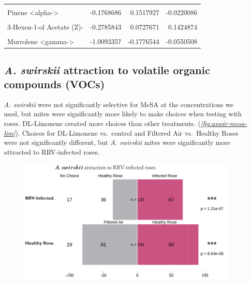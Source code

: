 \documentclass[12pt,final,CPage]{ufthesis}
\begin{document}
{\begin{longtable}[t]{lrrr}
  \cellcolor{gray!6}{Farnesene <(E,E)-, alpha->} & \cellcolor{gray!6}{-0.1703874} & \cellcolor{gray!6}{0.0430163} & \cellcolor{gray!6}{0.0170290}\\
  Pinene <alpha-> & -0.1768686 & 0.1517927 & -0.0220086\\
  \cellcolor{gray!6}{Ocimene, <beta->} & \cellcolor{gray!6}{-0.2027449} & \cellcolor{gray!6}{0.1639320} & \cellcolor{gray!6}{-0.0248480}\\
  3-Hexen-1-ol Acetate (Z)- & -0.2785843 & 0.0727671 & 0.1424874\\
  \addlinespace
  \cellcolor{gray!6}{Caryophyllene <beta->} & \cellcolor{gray!6}{-0.3896566} & \cellcolor{gray!6}{0.1118965} & \cellcolor{gray!6}{-0.0339373}\\
  Murrolene <gamma-> & -1.0093357 & -0.1776544 & -0.0550508\\*
  \end{longtable}
  \hypertarget{results-olfact}{%
  \subsection{\texorpdfstring{\emph{A. swirskii} attraction to volatile organic compounds (VOCs)}{A. swirskii attraction to volatile organic compounds (VOCs)}}\label{results-olfact}}

  \emph{A. swirskii} were not significantly selective for MeSA at the concentrations we used, but mites were significantly more likely to make choices when testing with roses. DL-Limonene created more choices than other treatments. (\emph{\ref{fig:aswir-mesa-lim}}). Choices for DL-Limonene vs.~control and Filtered Air vs.~Healthy Roses were not significantly different, but \emph{A. swirskii} mites were significantly more attracted to RRV-infected roses.
  \begin{figure}

  {\centering \includegraphics[width=1\linewidth]{figure/rrv_graph_olfact_rose} 

}
\end{figure}}
\end{document}

